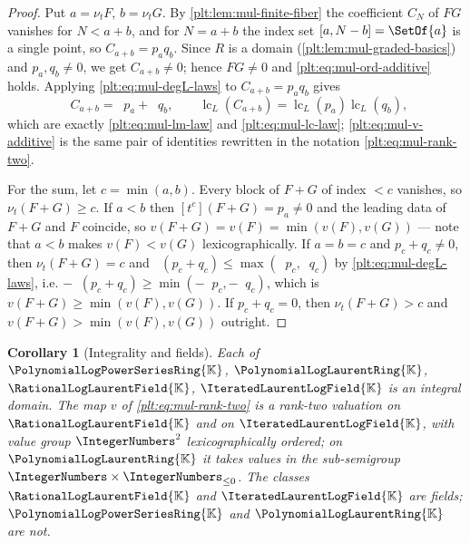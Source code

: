 \documentclass[11pt,oneside]{article}
\theoremstyle{plain}
\newtheorem{corollary}[theorem]{Corollary}
\theoremstyle{definition}
\theoremstyle{remark}
\newcommand{\K}{\mathbb{K}}
\newcommand{\PLpow}{\PolynomialLogPowerSeriesRing{\K}}   %
\newcommand{\PLlau}{\PolynomialLogLaurentRing{\K}}       %
\newcommand{\PLrat}{\RationalLogLaurentField{\K}}        %
\newcommand{\PLit}{\IteratedLaurentLogField{\K}}         %
\newcommand{\ordt}{\nu_{t}}                              %
\DeclareMathOperator{\lc}{lc}
\DeclareMathOperator{\degL}{deg_{L}}
\begin{document}
\begin{proof}
Put $a=\ordt F$, $b=\ordt G$.  By \cref{plt:lem:mul-finite-fiber} the
coefficient $C_N$ of $FG$ vanishes for $N<a+b$, and for $N=a+b$ the index set
$[a,N-b]=\SetOf{a}$ is a single point, so $C_{a+b}=p_aq_b$.  Since $R$ is a
domain (\cref{plt:lem:mul-graded-basics}) and $p_a,q_b\ne0$, we get
$C_{a+b}\ne0$; hence $FG\ne0$ and \eqref{plt:eq:mul-ord-additive} holds.
Applying \eqref{plt:eq:mul-degL-laws} to $C_{a+b}=p_aq_b$ gives
\[
 \degL C_{a+b}=\degL p_a+\degL q_b,
 \qquad
 \lc_L(C_{a+b})=\lc_L(p_a)\lc_L(q_b),
\]
which are exactly \eqref{plt:eq:mul-lm-law} and \eqref{plt:eq:mul-lc-law};
\eqref{plt:eq:mul-v-additive} is the same pair of identities rewritten in the
notation \eqref{plt:eq:mul-rank-two}.

For the sum, let $c=\min(a,b)$.  Every block of $F+G$ of index $<c$ vanishes,
so $\ordt(F+G)\ge c$.  If $a<b$ then $[t^c](F+G)=p_a\ne0$ and the leading
data of $F+G$ and $F$ coincide, so $v(F+G)=v(F)=\min(v(F),v(G))$ --- note
that $a<b$ makes $v(F)<v(G)$ lexicographically.  If $a=b=c$ and
$p_c+q_c\ne0$, then $\ordt(F+G)=c$ and
$\degL(p_c+q_c)\le\max(\degL p_c,\degL q_c)$ by
\eqref{plt:eq:mul-degL-laws}, i.e.
$-\degL(p_c+q_c)\ge\min(-\degL p_c,-\degL q_c)$, which is
$v(F+G)\ge\min(v(F),v(G))$.  If $p_c+q_c=0$, then $\ordt(F+G)>c$ and
$v(F+G)>\min(v(F),v(G))$ outright.
\end{proof}

\begin{corollary}[Integrality and fields]
\label{plt:cor:mul-domain}
Each of $\PLpow$, $\PLlau$, $\PLrat$, $\PLit$ is an integral domain.  The map
$v$ of \eqref{plt:eq:mul-rank-two} is a rank-two valuation on $\PLrat$ and on
$\PLit$, with value group $\IntegerNumbers^2$ lexicographically ordered; on
$\PLlau$ it takes values in the sub-semigroup
$\IntegerNumbers\times\IntegerNumbers_{\le0}$.  The classes $\PLrat$ and
$\PLit$ are fields; $\PLpow$ and $\PLlau$ are not.
\end{corollary}
\end{document}
